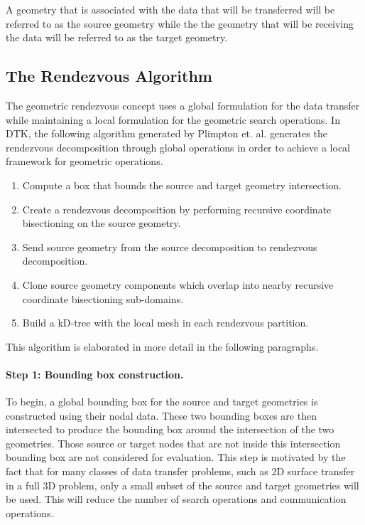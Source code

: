 \documentclass[letterpaper,12pt]{article}
\begin{document}
A geometry that is associated with the data that will be transferred
will be referred to as the source geometry while the the geometry that
will be receiving the data will be referred to as the target geometry.

\subsection{The Rendezvous Algorithm}\label{subsec:rendezvous_alg}
The geometric rendezvous concept uses a global formulation for the
data transfer while maintaining a local formulation for the geometric
search operations. In DTK, the following algorithm generated by
Plimpton et. al. \cite{Plimpton_2004} generates the rendezvous
decomposition through global operations in order to achieve a local
framework for geometric operations. 

\begin{enumerate}
\item Compute a box that bounds the source and target geometry
  intersection.
\item Create a rendezvous decomposition by performing recursive
  coordinate bisectioning on the source geometry.
\item Send source geometry from the source decomposition to rendezvous
  decomposition.
\item Clone source geometry components which overlap into nearby
  recursive coordinate bisectioning sub-domains.
\item Build a kD-tree with the local mesh in each rendezvous
  partition.
\end{enumerate}

This algorithm is elaborated in more detail in the following
paragraphs.

\paragraph{Step 1: Bounding box construction.}
To begin, a global bounding box for the source and target geometries
is constructed using their nodal data. These two bounding boxes are
then intersected to produce the bounding box around the intersection
of the two geometries. Those source or target nodes that are not
inside this intersection bounding box are not considered for
evaluation. This step is motivated by the fact that for many classes
of data transfer problems, such as 2D surface transfer in a full 3D
problem, only a small subset of the source and target geometries will
be used. This will reduce the number of search operations and
communication operations.
\end{document}

